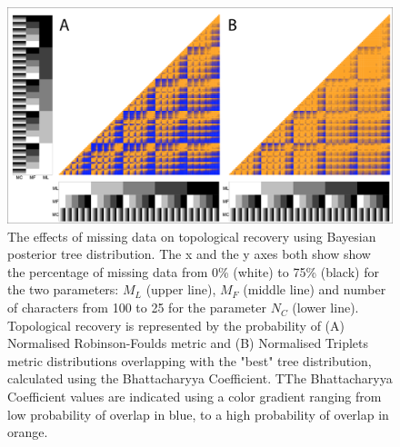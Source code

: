 \documentclass[12pt,letterpaper]{article}
\begin{document}
\begin{figure} 
\centering
    \includegraphics[width=1\textwidth]{SupplementaryFigures/PairwiseComp-Bayt-RF+Tr-colour.png} %
    \caption{The effects of missing data on topological recovery using Bayesian posterior tree distribution. The x and the y axes both show show the percentage of missing data from 0\% (white) to 75\% (black) for the two parameters: $M_{L}$ (upper line), $M_{F}$ (middle line) and number of characters from 100 to 25 for the parameter $N_{C}$ (lower line). Topological recovery is represented by the probability of (A) Normalised Robinson-Foulds metric and (B) Normalised Triplets metric distributions overlapping with the "best" tree distribution, calculated using the Bhattacharyya Coefficient. TThe Bhattacharyya Coefficient values are indicated using a color gradient ranging from low probability of overlap in blue, to a high probability of overlap in orange.}
\label{Fig_Supp_paircomp_Bayt}
\end{figure} 
\end{document}
